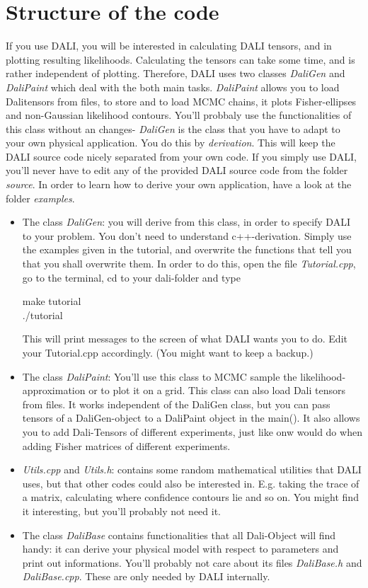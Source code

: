 \documentclass[12pt,twoside]{extarticle}
\newenvironment{exercise}{\begin{eBox}}{\hfill{\color{daliblue}}\end{eBox}}
\begin{document}
\section{Structure of the code}
If you use DALI, you will be interested in calculating DALI tensors, and in plotting resulting likelihoods. Calculating the tensors can take some time, and is rather independent of plotting. Therefore, DALI uses two classes \emph{DaliGen} and \emph{DaliPaint} which deal with the both main tasks. \emph{DaliPaint} allows you to load Dalitensors from files, to store and to load MCMC chains, it plots Fisher-ellipses and non-Gaussian likelihood contours. You'll probbaly use the functionalities of this class without an changes- \emph{DaliGen} is the class that you have to adapt to your own physical application. You do this by \emph{derivation}. This will keep the DALI source code nicely separated from your own code. If you simply use DALI, you'll never have to edit any of the provided DALI source code from the folder \emph{source}. In order to learn how to derive your own application, have a look at the folder \emph{examples}. 

\begin{itemize}
\item The class \emph{DaliGen}: you will derive from this class, in order to specify DALI to your problem. You don't need to understand c++-derivation. Simply use the examples given in the tutorial, and overwrite the functions that tell you that you shall overwrite them. In order to do this, open the file \emph{Tutorial.cpp}, go to the terminal, cd to your dali-folder and type\\
\begin{exercise}
 make tutorial\\
./tutorial\\
\end{exercise}
This will print messages to the screen of what DALI wants you to do. Edit your Tutorial.cpp accordingly. (You might want to keep a backup.)
\item The class \emph{DaliPaint}: You'll use this class to MCMC sample the likelihood-approximation or to plot it on a grid. This class can also load Dali tensors from files. It works independent of the DaliGen class, but you can pass tensors of a DaliGen-object to a DaliPaint object in the main(). It also allows you to add Dali-Tensors of different experiments, just like onw would do when adding Fisher matrices of different experiments.
\item \emph{Utils.cpp} and \emph{Utils.h}: contains some random mathematical utilities that DALI uses, but that other codes could also be interested in. E.g. taking the trace of a matrix, calculating where confidence contours lie and so on. You might find it interesting, but you'll probably not need it.
\item The class \emph{DaliBase} contains functionalities that all Dali-Object will find handy: it can derive your physical model with respect to parameters and print out informations. You'll probably not care about its files \emph{DaliBase.h} and \emph{DaliBase.cpp}. These are only needed by DALI internally.
\end{itemize}
\end{document}
